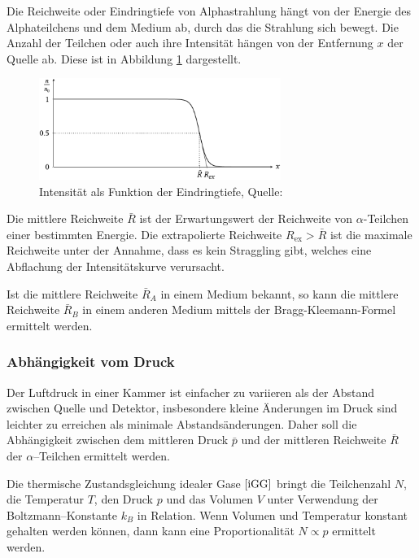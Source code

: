 \documentclass[12pt,a4paper]{scrartcl}
\numberwithin{equation}{section} %
\begin{document}
Die Reichweite oder Eindringtiefe von Alphastrahlung hängt von der Energie des Alphateilchens und dem Medium ab, durch das die Strahlung sich bewegt. Die Anzahl der Teilchen oder auch ihre Intensität hängen von der Entfernung $x$ der Quelle ab. Diese ist in Abbildung \ref{abb:Reichweite} dargestellt.

\begin{figure}[H]
	\centering
	\includegraphics[width=0.7\textwidth]{../media/B3.3/Reichweite.pdf}
	\caption{Intensität als Funktion der Eindringtiefe, Quelle: \cite{Uni}}
	\label{abb:Reichweite}
\end{figure}

\noindent
Die mittlere Reichweite $\bar R$ ist der Erwartungswert der Reichweite von $\alpha$-Teilchen einer bestimmten Energie. Die extrapolierte Reichweite $R_\mathrm{ex}>\bar R$ ist die maximale Reichweite unter der Annahme, dass es kein Straggling gibt, welches eine Abflachung der Intensitätskurve verursacht.

Ist die mittlere Reichweite $\bar R_A$ in einem Medium bekannt, so kann die mittlere Reichweite $\bar R_B$ in einem anderen Medium mittels der Bragg-Kleemann-Formel ermittelt werden.

\hypertarget{abhuxe4ngigkeit-vom-druck}{%
\subsubsection{Abhängigkeit vom Druck}\label{abhuxe4ngigkeit-vom-druck}}

Der Luftdruck in einer Kammer ist einfacher zu variieren als der Abstand zwischen Quelle und Detektor, insbesondere kleine Änderungen im Druck sind leichter zu erreichen als minimale Abstandsänderungen. Daher soll die Abhängigkeit zwischen dem mittleren Druck $\bar p$ und der mittleren Reichweite $\bar R$ der $\alpha$--Teilchen ermittelt werden.

Die thermische Zustandsgleichung idealer Gase $\eqref{iGG}$ bringt die Teilchenzahl $N$, die Temperatur $T$, den Druck $p$ und das Volumen $V$ unter Verwendung der Boltzmann--Konstante $k_B$ in Relation. Wenn Volumen und Temperatur konstant gehalten werden können, dann kann eine Proportionalität $N\propto p$ ermittelt werden.
\end{document}
